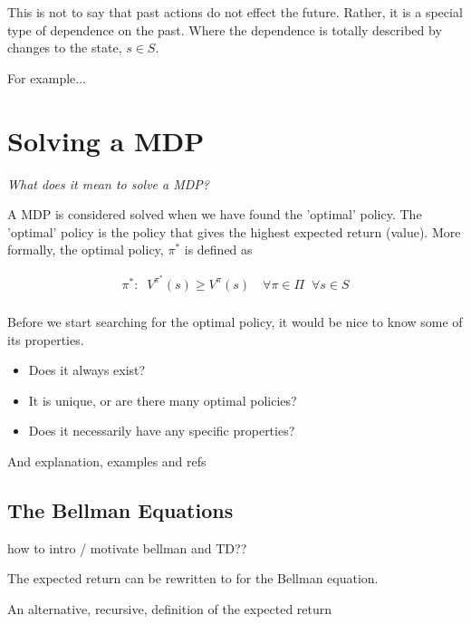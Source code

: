 This is not to say that past actions do not effect the future. Rather,
it is a special type of dependence on the past. Where the dependence is
totally described by changes to the state, $s\in S$.

{\color{red}For example...}


\section{Solving a MDP}

\begin{displayquote}
  \textit{What does it mean to solve a MDP?}
\end{displayquote}

A MDP is considered solved when we have found the 'optimal' policy. The 'optimal'
policy is the policy that gives the highest expected return (value).
More formally, the optimal policy, $\pi^{* }$ is defined as

\begin{align*}
\pi^{*} : \;\; V^{\pi^* }(s) \ge V^{\pi}(s) \quad \forall \pi\in \Pi \;\;\forall s\in S\\
\end{align*}

Before we start searching for the optimal policy, it would be nice to know some of its properties.

\begin{itemize}
\tightlist
  \item Does it always exist?
  \item It is unique, or are there many optimal policies?
  \item Does it necessarily have any specific properties?
\end{itemize}

{\color{red} And explanation, examples and refs}

\subsection{The Bellman Equations}

{\color{red}how to intro / motivate bellman and TD??}

The expected return can be rewritten to for the Bellman equation.

An alternative, recursive, definition of the expected return


